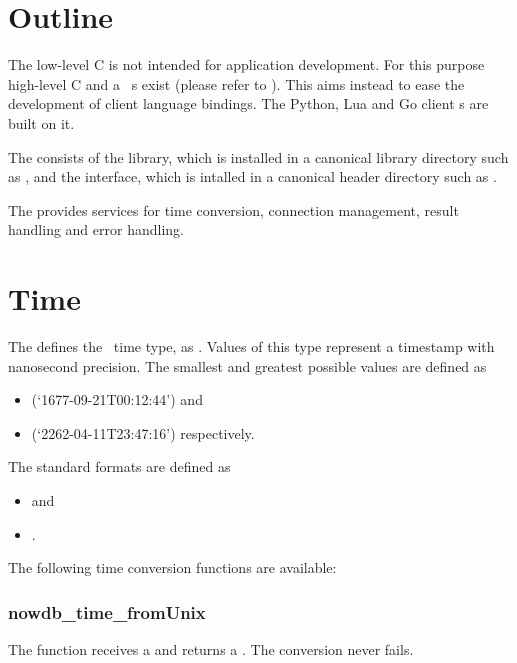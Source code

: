\section{Outline}
The low-level C  is not intended
for application development. For this purpose
high-level C and a \CC\ s exist
(please refer to ).
This  aims instead to ease
the development of client language bindings.
The Python, Lua and Go client s
are built on it.

The  consists of the 
library, which is installed in a canonical library directory
such as ,
and the  interface,
which is intalled in a canonical header directory
such as .

The  provides services for
time conversion, connection management,
result handling and error handling.

\section{Time}
The  defines the \nowdb\ time type,
 as .
Values of this type represent a 
timestamp with nanosecond precision.
The smallest and greatest possible values
are defined as 
\begin{itemize}
\item {}
(`1677-09-21T00:12:44')
and
\item {}
(`2262-04-11T23:47:16')
respectively.
\end{itemize}

The standard formats are defined as
\begin{itemize}
\item {}
 and
\item {}
. 
\end{itemize}

The following time conversion functions are available:

\subsubsection{nowdb\_time\_fromUnix}
The function receives a  
and returns a . The conversion never fails.

